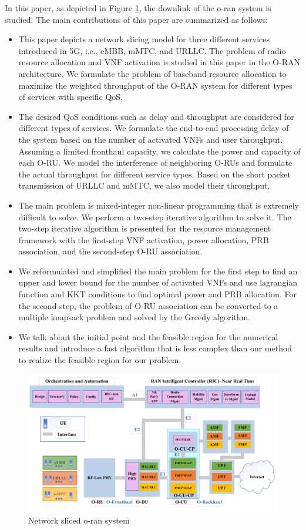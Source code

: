 \documentclass[lettersize,journal]{IEEEtran}
\begin{document}
In this paper, as depicted in Figure \ref{fig:c11}, the downlink of the o-ran system is studied. The main contributions of this paper are summarized as follows:
\begin{itemize}
\item This paper depicts a network slicing model for three different services introduced in 5G, i.e., eMBB, mMTC, and URLLC. The problem of radio resource allocation and VNF activation is studied in this paper in the O-RAN architecture.
We formulate the problem of baseband resource allocation to maximize the weighted throughput of the O-RAN system for different types of services with specific QoS. 
\item The desired QoS conditions such as delay and throughput are considered for different types of services. We formulate the end-to-end processing delay of the system based on the number of activated VNFs and user throughput.
Assuming a limited fronthaul capacity, we calculate the power and capacity of each O-RU. We model the interference of neighboring O-RUs and formulate the actual throughput for different service types. Based on the short packet transmission of URLLC and mMTC, we also model their throughput.
\item The main problem is mixed-integer non-linear programming that is extremely difficult to solve.
We perform a two-step iterative algorithm to solve it.
The two-step iterative algorithm is presented for the resource management framework with the first-step VNF activation, power allocation, PRB association, and the second-step O-RU association.
\item We reformulated and simplified the main problem for the first step to find an upper and lower bound for the number of activated VNFs and use lagrangian function and KKT conditions to find optimal power and PRB allocation.
For the second step, the problem of O-RU association can be converted to a multiple knapsack problem and solved by the Greedy algorithm.
\item We talk about the initial point and the feasible region for the numerical results and introduce a fast algorithm that is less complex than our method to realize the feasible region for our problem.
\end{itemize}  
\begin{figure}
  \centering 
  \captionsetup{justification=centering}
    \includegraphics[scale = 0.45]{finalDraw.pdf}
  \caption{Network sliced o-ran system}
  \label{fig:c11}
\end{figure}
\end{document}
